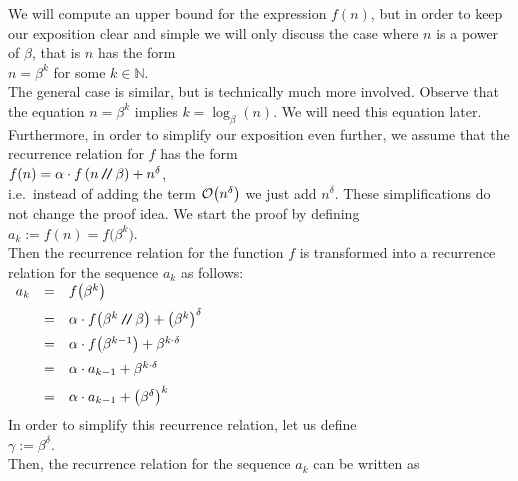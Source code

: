 \proof
We will compute an upper bound for the expression $f(n)$, but in order to keep our exposition clear
and simple we will only discuss the case where $n$ is a power of $\beta$, that is $n$ has the form
\\[0.2cm]
\hspace*{1.3cm}
$n = \beta^k$ \quad for some $k \in \mathbb{N}$.
\\[0.2cm]
The general case is similar, but is technically much more involved.
Observe that the equation $n = \beta^k$ implies $k = \log_{\beta}(n)$.  We will need this equation later. 
Furthermore, in order to simplify our exposition even further, we assume that the recurrence
relation for $f$ has the form 
\\[0.2cm]
\hspace*{1.3cm}
 $f(n) = \alpha \cdot f\left(n \mbox{\,\texttt{/}$\!$\texttt{/}\,} \beta\right) + n^\delta$,
\\[0.2cm]
i.e.~instead of adding the term $\mathcal{O}\bigl(n^\delta\bigr)$ we just add $n^\delta$.  These
simplifications do not change the proof idea.  We start the proof by defining
\\[0.2cm]
\hspace*{1.3cm}
 $a_k := f(n) = f\bigl(\beta^k\bigr)$.  
\\[0.2cm]
Then the recurrence relation for the function $f$
is transformed into a recurrence relation for the sequence $a_k$ as follows:
\\[0.2cm]
\hspace*{1.3cm}
$
\begin{array}[t]{lcl}
a_k & = & f\bigl(\beta^{k}\bigr)                                             \\[0.2cm]
    & = & \alpha \cdot f\bigl(\beta^{k} \mbox{\,\texttt{/}$\!$\texttt{/}\,} \beta\bigr) + \bigl(\beta^{k}\bigr)^\delta    \\[0.2cm]
    & = & \alpha \cdot f\bigl(\beta^{k-1}\bigr) + \beta^{k \cdot \delta}    \\[0.2cm]
    & = & \alpha \cdot a_{k-1} + \beta^{k \cdot \delta}    \\[0.2cm]
    & = & \alpha \cdot a_{k-1} + \bigl(\beta^{\delta}\bigr)^k    \\[0.2cm]
\end{array}
$
\\[0.2cm]
In order to simplify this recurrence relation, let us define
\\[0.2cm]
\hspace*{1.3cm}
$\gamma := \beta^{\delta}$.
\\[0.2cm]
Then, the recurrence relation for the sequence $a_k$ can be written as
